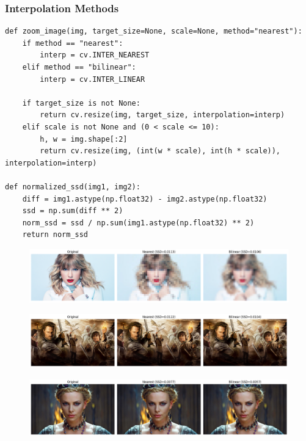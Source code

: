\documentclass[11pt]{article}
\begin{document}
\subsubsection{Interpolation Methods}


\begin{lstlisting}[style=pythonstyle]
def zoom_image(img, target_size=None, scale=None, method="nearest"):
    if method == "nearest":
        interp = cv.INTER_NEAREST
    elif method == "bilinear":
        interp = cv.INTER_LINEAR

    if target_size is not None:
        return cv.resize(img, target_size, interpolation=interp)
    elif scale is not None and (0 < scale <= 10):
        h, w = img.shape[:2]
        return cv.resize(img, (int(w * scale), int(h * scale)), interpolation=interp)

def normalized_ssd(img1, img2):
    diff = img1.astype(np.float32) - img2.astype(np.float32)
    ssd = np.sum(diff ** 2)
    norm_ssd = ssd / np.sum(img1.astype(np.float32) ** 2)
    return norm_ssd
\end{lstlisting}

\begin{figure}[H]
    \centering
    \includegraphics[width=0.9\linewidth]{resources/q8_taylor.png}
    \label{fig:placeholder}
\end{figure}

\begin{figure}[H]
    \centering
    \includegraphics[width=0.9\linewidth]{resources/q8_king.png}
    \label{fig:placeholder}
\end{figure}

\begin{figure}[H]
    \centering
    \includegraphics[width=0.9\linewidth]{resources/q8_queen.png}
    \label{fig:placeholder}
\end{figure}
\end{document}
